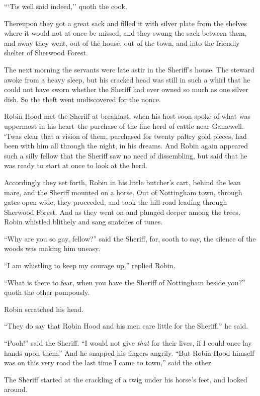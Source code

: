 ```Tis well said indeed,'' quoth the cook.

Thereupon they got a great sack and filled it with silver plate from the
shelves where it would not at once be missed, and they swung the sack
between them, and away they went, out of the house, out of the town, and
into the friendly shelter of Sherwood Forest.

The next morning the servants were late astir in the Sheriff's house.
The steward awoke from a heavy sleep, but his cracked head was still in
such a whirl that he could not have sworn whether the Sheriff had ever
owned so much as one silver dish. So the theft went undiscovered for the
nonce.

Robin Hood met the Sheriff at breakfast, when his host soon spoke of
what was uppermost in his heart--the purchase of the fine herd of cattle
near Gamewell. `Twas clear that a vision of them, purchased for twenty
paltry gold pieces, had been with him all through the night, in his
dreams. And Robin again appeared such a silly fellow that the Sheriff
saw no need of dissembling, but said that he was ready to start at once
to look at the herd.

Accordingly they set forth, Robin in his little butcher's cart, behind
the lean mare, and the Sheriff mounted on a horse. Out of Nottingham
town, through gates open wide, they proceeded, and took the hill road
leading through Sherwood Forest. And as they went on and plunged deeper
among the trees, Robin whistled blithely and sang snatches of tunes.

``Why are you so gay, fellow?'' said the Sheriff, for, sooth to say, the
silence of the woods was making him uneasy.

``I am whistling to keep my courage up,'' replied Robin.

``What is there to fear, when you have the Sheriff of Nottingham beside
you?'' quoth the other pompously.

Robin scratched his head.

``They do say that Robin Hood and his men care little for the Sheriff,''
he said.

``Pooh!'' said the Sheriff. ``I would not give \emph{that} for their
lives, if I could once lay hands upon them.'' And he snapped his fingers
angrily. ``But Robin Hood himself was on this very road the last time I
came to town,'' said the other.

The Sheriff started at the crackling of a twig under his horse's feet,
and looked around.


